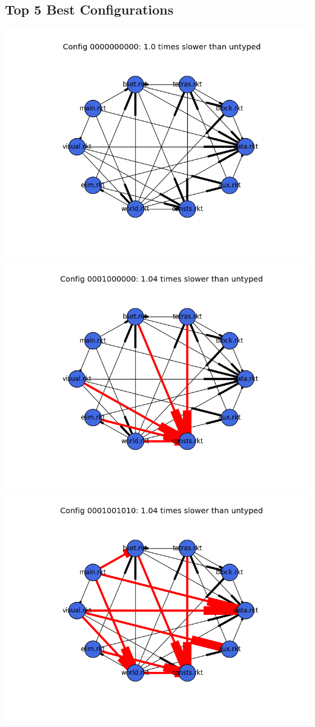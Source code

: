 \documentclass{article}
\begin{document}
\begin{itemize}
\subsection{Top 5 Best Configurations}
\includegraphics[width=\textwidth]{tetris-module-graph-0000000000.png}
\includegraphics[width=\textwidth]{tetris-module-graph-0001000000.png}
\includegraphics[width=\textwidth]{tetris-module-graph-0001001010.png}

\end{itemize}
\end{document}
